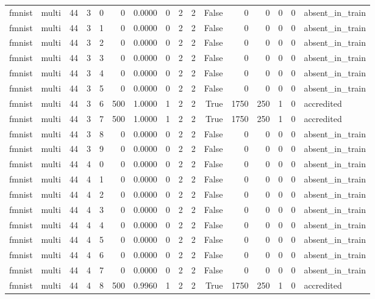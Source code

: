 \begin{tabular}{llrrrrrrrrrrrrrl}
fmnist & multi & 44 & 3 & 0 & 0 & 0.0000 & 0 & 2 & 2 & False & 0 & 0 & 0 & 0 & absent\_in\_train \\
fmnist & multi & 44 & 3 & 1 & 0 & 0.0000 & 0 & 2 & 2 & False & 0 & 0 & 0 & 0 & absent\_in\_train \\
fmnist & multi & 44 & 3 & 2 & 0 & 0.0000 & 0 & 2 & 2 & False & 0 & 0 & 0 & 0 & absent\_in\_train \\
fmnist & multi & 44 & 3 & 3 & 0 & 0.0000 & 0 & 2 & 2 & False & 0 & 0 & 0 & 0 & absent\_in\_train \\
fmnist & multi & 44 & 3 & 4 & 0 & 0.0000 & 0 & 2 & 2 & False & 0 & 0 & 0 & 0 & absent\_in\_train \\
fmnist & multi & 44 & 3 & 5 & 0 & 0.0000 & 0 & 2 & 2 & False & 0 & 0 & 0 & 0 & absent\_in\_train \\
fmnist & multi & 44 & 3 & 6 & 500 & 1.0000 & 1 & 2 & 2 & True & 1750 & 250 & 1 & 0 & accredited \\
fmnist & multi & 44 & 3 & 7 & 500 & 1.0000 & 1 & 2 & 2 & True & 1750 & 250 & 1 & 0 & accredited \\
fmnist & multi & 44 & 3 & 8 & 0 & 0.0000 & 0 & 2 & 2 & False & 0 & 0 & 0 & 0 & absent\_in\_train \\
fmnist & multi & 44 & 3 & 9 & 0 & 0.0000 & 0 & 2 & 2 & False & 0 & 0 & 0 & 0 & absent\_in\_train \\
fmnist & multi & 44 & 4 & 0 & 0 & 0.0000 & 0 & 2 & 2 & False & 0 & 0 & 0 & 0 & absent\_in\_train \\
fmnist & multi & 44 & 4 & 1 & 0 & 0.0000 & 0 & 2 & 2 & False & 0 & 0 & 0 & 0 & absent\_in\_train \\
fmnist & multi & 44 & 4 & 2 & 0 & 0.0000 & 0 & 2 & 2 & False & 0 & 0 & 0 & 0 & absent\_in\_train \\
fmnist & multi & 44 & 4 & 3 & 0 & 0.0000 & 0 & 2 & 2 & False & 0 & 0 & 0 & 0 & absent\_in\_train \\
fmnist & multi & 44 & 4 & 4 & 0 & 0.0000 & 0 & 2 & 2 & False & 0 & 0 & 0 & 0 & absent\_in\_train \\
fmnist & multi & 44 & 4 & 5 & 0 & 0.0000 & 0 & 2 & 2 & False & 0 & 0 & 0 & 0 & absent\_in\_train \\
fmnist & multi & 44 & 4 & 6 & 0 & 0.0000 & 0 & 2 & 2 & False & 0 & 0 & 0 & 0 & absent\_in\_train \\
fmnist & multi & 44 & 4 & 7 & 0 & 0.0000 & 0 & 2 & 2 & False & 0 & 0 & 0 & 0 & absent\_in\_train \\
fmnist & multi & 44 & 4 & 8 & 500 & 0.9960 & 1 & 2 & 2 & True & 1750 & 250 & 1 & 0 & accredited \\

\end{tabular}
